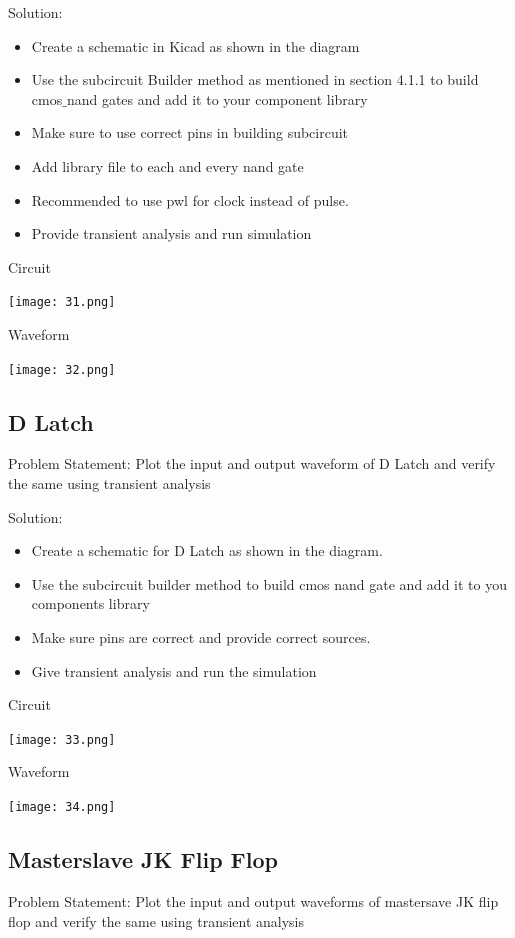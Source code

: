 \documentclass[12pt,a4paper]{  report}
\begin{document}
Solution:
\begin{itemize}
\item Create a schematic in Kicad as shown in the diagram
\item Use the subcircuit Builder method as mentioned in section 4.1.1 to build cmos$\_$nand gates and add it to your component library
\item Make sure to use correct pins in building subcircuit
\item Add library file to each and every nand gate
\item Recommended to use pwl for clock instead of pulse.
\item Provide transient analysis and run simulation
\end{itemize}

Circuit
 \begin{flushleft}
\texttt{[image: 31.png]}
\end{flushleft}

Waveform
 \begin{flushleft}
\texttt{[image: 32.png]}
\end{flushleft}

\subsection{D Latch}
Problem Statement:
Plot the input and output waveform of D Latch and verify the same using transient analysis

Solution:
\begin{itemize}
\item Create a schematic for D Latch as shown in the diagram.
\item Use the subcircuit builder method to build  cmos nand gate and add it to you components library
\item Make sure pins are correct and provide correct sources.
\item Give transient analysis and run the simulation
\end{itemize}

Circuit
 \begin{flushleft}
\texttt{[image: 33.png]}
\end{flushleft}

Waveform
 \begin{flushleft}
\texttt{[image: 34.png]}
\end{flushleft}

\subsection{ Masterslave JK Flip Flop}
Problem Statement:
Plot the input and output waveforms of mastersave JK flip flop and verify the same using transient analysis
\end{document}
